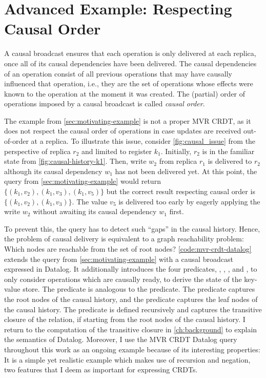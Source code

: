 \section{Advanced Example: Respecting Causal Order}\label{sec:advanced_example}



A causal broadcast ensures that each operation is only delivered at each replica,
once all of its causal dependencies have been delivered.
The causal dependencies of an operation consist of all previous operations
that may have causally influenced that operation, i.e.,
they are the set of operations whose effects were known to the operation
at the moment it was created.
The (partial) order of operations imposed by a causal broadcast is
called \emph{causal order}.

The example from \autoref{sec:motivating-example} is not a proper
\ac{MVR} \ac{CRDT}, as it does not respect the causal order of operations
in case updates are received out-of-order at a replica.
To illustrate this issue, consider \autoref{fig:causal_issue} from the
perspective of replica \(r_2\) and limited to register \(k_1\).
Initially, \(r_2\) is in the familiar state from \autoref{fig:causal-history-k1}.
Then, write \(w_2\) from replica \(r_1\) is delivered to \(r_2\) although its
causal dependency \(w_1\) has not been delivered yet.
At this point, the query from \autoref{sec:motivating-example} would return
\(\{ (k_1, v_2), (k_1, v_3), (k_1, v_5)\} \)
but the correct result respecting causal order is
\(\{ (k_1, v_2), (k_1, v_3) \}\).
The value \(v_5\) is delivered too early by eagerly applying the write \(w_2\)
without awaiting its causal dependency \(w_1\) first.

To prevent this, the query has to detect such ``gaps'' in the causal history.
Hence, the problem of causal delivery is equivalent to a graph reachability
problem: Which nodes are reachable from the set of root nodes?
\ref{code:mvr-crdt-datalog} extends the query from \autoref{sec:motivating-example}
with a causal broadcast expressed in Datalog.
It additionally introduces the four predicates, , ,
, and , to only consider operations
which are causally ready, to derive the state of the key-value store.
The  predicate is analogous to the  predicate.
The  predicate captures the root nodes of the causal history,
and the  predicate captures the leaf nodes of the causal history.
The  predicate is defined recursively and captures
the transitive closure of the  relation,
if starting from the root nodes of the causal history.
I return to the computation of the transitive closure in \ref{ch:background} to
explain the semantics of Datalog.
Moreover, I use the \ac{MVR} \ac{CRDT} Datalog query throughout this work
as an ongoing example because of its interesting properties:
It is a simple yet realistic example which makes use of recursion and negation,
two features that I deem as important for expressing \acp{CRDT}.

